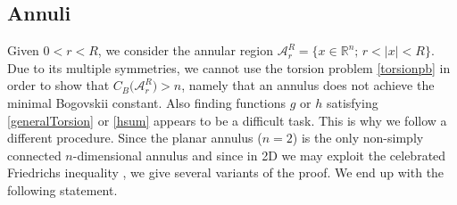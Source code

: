 \documentclass[11pt]{article}
\theoremstyle{plain}
\theoremstyle{definition}
\numberwithin{equation}{section}
\newcommand{\R}{\mathbb{R}}
\begin{document}
\subsection{Annuli}\label{sec:annuli}

Given $0 < r < R$, we consider the annular region $\mathcal{A}_r^R=\{x\in\R^n;\, r<|x|<R\}$.
Due to its multiple symmetries, we cannot use the torsion problem \eqref{torsionpb} in order to show that $C_B\big(\mathcal{A}_r^R\big)>n$, namely that an annulus does not achieve the minimal Bogovskii constant.
Also finding functions $g$ or $h$ satisfying \eqref{generalTorsion} or \eqref{hsum} appears to be a difficult task. This is why we follow a different procedure. Since the planar annulus ($n=2$) is the only non-simply connected $n$-dimensional annulus and since in 2D we may exploit the celebrated
Friedrichs inequality \cite{friedrichs1937certain}, we give several variants of the proof. We end up with the following statement.
\end{document}

